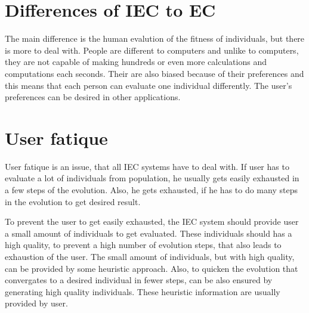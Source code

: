 \section{Differences of IEC to EC}
The main difference is the human evalution of the fitness of individuals, but there is more to deal with. People are different to computers and unlike to computers, they are not capable of making hundreds or even more calculations and computations each seconds. Their are also biased because of their preferences and this means that each person can evaluate one individual differently. The user's preferences can be desired in other applications.
\section{User fatique}
User fatique is an issue, that all IEC systems have to deal with. If user has to evaluate a lot of individuals from population, he usually gets easily exhausted in a few steps of the evolution. Also, he gets exhausted, if he has to do many steps in the evolution to get desired result.

To prevent the user to get easily exhausted, the IEC system should provide user a small amount of individuals to get evaluated. These individuals should has a high quality, to prevent a high number of evolution steps, that also leads to exhaustion of the user. The small amount of individuals, but with high quality, can be provided by some heuristic approach. Also, to quicken the evolution that convergates to a desired individual in fewer steps, can be also ensured by generating high quality individuals. These heuristic information are usually provided by user.
